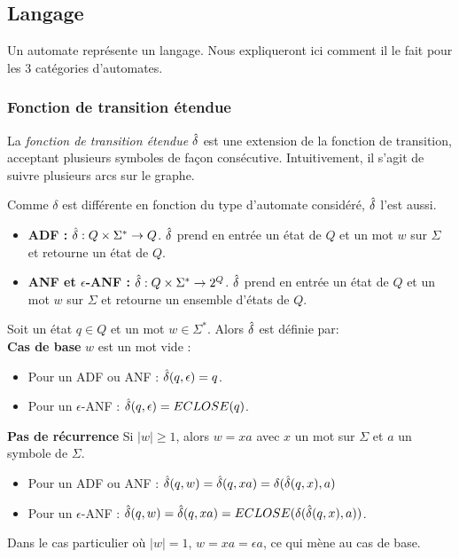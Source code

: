 

\subsection{Langage}

Un automate représente un langage. Nous expliqueront ici comment il le fait pour les 3 catégories d'automates.

\subsubsection*{Fonction de transition étendue}

La \emph{fonction de transition étendue} $\hat{\delta}$ est une extension de la fonction de transition, acceptant plusieurs symboles de façon consécutive. Intuitivement, il s'agit de suivre plusieurs arcs sur le graphe.

Comme $\delta$ est différente en fonction du type d'automate considéré, $\hat{\delta}$ l'est aussi.

\begin{itemize}
  \item \textbf{ADF :} $\hat{\delta} : Q \times \Sigma^* \rightarrow Q$. $\hat{\delta}$ prend en entrée un état de $Q$ et un mot $w$ sur $\Sigma$ et retourne un état de $Q$.
  \item \textbf{ANF et $\epsilon$-ANF :} $\hat{\delta} : Q \times \Sigma^* \rightarrow 2^Q$. $\hat{\delta}$ prend en entrée un état de $Q$ et un mot $w$ sur $\Sigma$ et retourne un ensemble d'états de $Q$.
\end{itemize}

Soit un état $q \in Q$ et un mot $w \in \Sigma^*$. Alors $\hat{\delta}$ est définie par:\\
\textbf{Cas de base} $w$ est un mot vide :
  \begin{itemize}
    \item Pour un ADF ou ANF : $\hat{\delta}(q, \epsilon) = q$.
    \item Pour un $\epsilon$-ANF : $\hat{\delta}(q, \epsilon) = ECLOSE(q)$.
  \end{itemize}
\textbf{Pas de récurrence} Si $|w|\ge 1$, alors $w=xa$ avec $x$ un mot sur $\Sigma$ et $a$ un symbole de $\Sigma$.
\begin{itemize}
  \item Pour un ADF ou ANF : $\hat{\delta}(q,w) = \hat{\delta}(q,xa)= \delta(\hat{\delta}(q,x),a)$
  \item Pour un $\epsilon$-ANF : $\hat{\delta}(q,w) = \hat{\delta}(q,xa)= ECLOSE(\delta(\hat{\delta}(q,x),a))$.
\end{itemize}
Dans le cas particulier où $|w|=1$, $w=xa=\epsilon a$, ce qui mène au cas de base.

